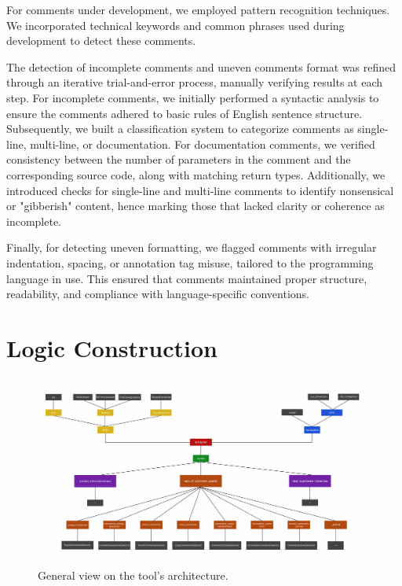 \noindent For comments under development, we employed pattern recognition techniques. We incorporated technical keywords and common phrases used during development to detect these comments.

\noindent The detection of incomplete comments and uneven comments format was refined through an iterative trial-and-error process, manually verifying results at each step. For incomplete comments, we initially performed a syntactic analysis to ensure the comments adhered to basic rules of English sentence structure. Subsequently, we built a classification system to categorize comments as single-line, multi-line, or documentation. For documentation comments, we verified consistency between the number of parameters in the comment and the corresponding source code, along with matching return types. Additionally, we introduced checks for single-line and multi-line comments to identify nonsensical or "gibberish" content, hence marking those that lacked clarity or coherence as incomplete.

\noindent Finally, for detecting uneven formatting, we flagged comments with irregular indentation, spacing, or annotation tag misuse, tailored to the programming language in use. This ensured that comments maintained proper structure, readability, and compliance with language-specific conventions.

\section{Logic Construction}

\begin{figure}[ht]
	\centering\includegraphics[width=400pt]{figs/whole-architecture.PNG}
	\captionsetup{justification=centering}
	\caption{General view on the tool's architecture.}
	\label{fig:whole-architecture}
\end{figure}

